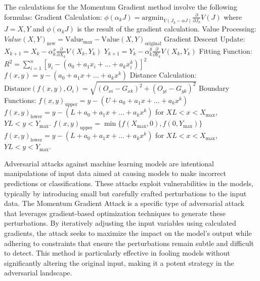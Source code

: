 The calculations for the Momentum Gradient method involve the following formulas:
Gradient Calculation:
$\phi(\alpha_k J) = \text{argmin}_{V(J_k - \alpha J)} \frac{\partial}{\partial J_k} V(J)$
where $J = X, Y $ and $\phi(\alpha_k J) $ is the result of the gradient calculation.
Value Processing:
$Value (X, Y)_{\text{new}} = \text{Value}_{\text{max}} - \text{Value}(X, Y)_{\text{original}}$
Gradient Descent Update:
$X_{k+1} = X_k - \alpha_k^x \frac{\partial}{\partial X_k} V(X_k, Y_k)$
$Y_{k+1} = Y_k - \alpha_k^y \frac{\partial}{\partial Y_k} V(X_k, Y_k)$
Fitting Function:
$R^2 = \sum_{i=1}^n [y_i - (a_0 + a_1x_i + \ldots + a_kx_i^k)]^2$
$f(x, y) = y - (a_0 + a_1x + \ldots + a_kx^k)$
Distance Calculation:
$\text{Distance}(f(x, y), O_i) = \sqrt{(O_{xi} - G_{xk})^2 + (O_{yi} - G_{yk})^2}$
Boundary Functions:
$f(x, y)_{\text{upper}} = y - (U + a_0 + a_1x + \ldots + a_kx^k)$
$f(x, y)_{\text{lower}} = y - (L + a_0 + a_1x + \ldots + a_kx^k)$
for $ XL < x < X_{\text{max}}$, $YL < y < Y_{\text{max}}$.
$f(x, y)_{\text{upper}} = \min\{f(X_{\text{max}}, 0), f(0, Y_{\text{max}})\}$
$f(x, y)_{\text{lower}} = y - (L + a_0 + a_1x + \ldots + a_kx^k)$
for $ XL < x < X_{\text{max}}$, $YL < y < Y_{\text{max}}$.

Adversarial attacks against machine learning models are intentional manipulations of input data aimed at causing models to make incorrect predictions or classifications. These attacks exploit vulnerabilities in the models, typically by introducing small but carefully crafted perturbations to the input data. The Momentum Gradient Attack is a specific type of adversarial attack that leverages gradient-based optimization techniques to generate these perturbations. By iteratively adjusting the input variables using calculated gradients, the attack seeks to maximize the impact on the model's output while adhering to constraints that ensure the perturbations remain subtle and difficult to detect. This method is particularly effective in fooling models without significantly altering the original input, making it a potent strategy in the adversarial landscape.
